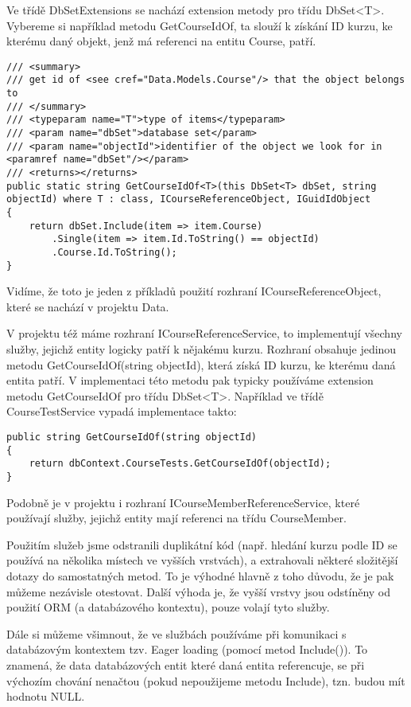 Ve třídě DbSetExtensions se nachází extension metody pro třídu DbSet<T>. Vybereme si například metodu GetCourseIdOf, ta slouží k získání ID kurzu, ke kterému daný objekt, jenž má referenci na entitu Course, patří.
\begin{lstlisting}
/// <summary>
/// get id of <see cref="Data.Models.Course"/> that the object belongs to
/// </summary>
/// <typeparam name="T">type of items</typeparam>
/// <param name="dbSet">database set</param>
/// <param name="objectId">identifier of the object we look for in <paramref name="dbSet"/></param>
/// <returns></returns>
public static string GetCourseIdOf<T>(this DbSet<T> dbSet, string objectId) where T : class, ICourseReferenceObject, IGuidIdObject
{
	return dbSet.Include(item => item.Course)
		.Single(item => item.Id.ToString() == objectId)
		.Course.Id.ToString();
}
\end{lstlisting}

Vidíme, že toto je jeden z příkladů použití rozhraní ICourseReferenceObject, které se nachází v projektu Data.

V projektu též máme rozhraní ICourseReferenceService, to implementují všechny služby, jejichž entity logicky patří k nějakému kurzu. Rozhraní obsahuje jedinou metodu GetCourseIdOf(string objectId), která získá ID kurzu, ke kterému daná entita patří. V implementaci této metodu pak typicky používáme extension metodu GetCourseIdOf pro třídu DbSet<T>. Například ve třídě CourseTestService vypadá implementace takto:

\begin{lstlisting}
public string GetCourseIdOf(string objectId)
{
	return dbContext.CourseTests.GetCourseIdOf(objectId);
}
\end{lstlisting}

Podobně je v projektu i rozhraní ICourseMemberReferenceService, které používají služby, jejichž entity mají referenci na třídu CourseMember.

Použitím služeb jsme odstranili duplikátní kód (např. hledání kurzu podle ID se používá na několika místech ve vyšších vrstvách), a extrahovali některé složitější dotazy do samostatných metod. To je výhodné hlavně z toho důvodu, že je pak můžeme nezávisle otestovat. Další výhoda je, že vyšší vrstvy jsou odstíněny od použití ORM (a databázového kontextu), pouze volají tyto služby.

Dále si můžeme všimnout, že ve službách používáme při komunikaci s databázovým kontextem tzv. Eager loading (pomocí metod Include()). To znamená, že data databázových entit které daná entita referencuje, se při výchozím chování nenačtou (pokud nepoužijeme metodu Include), tzn. budou mít hodnotu NULL.

